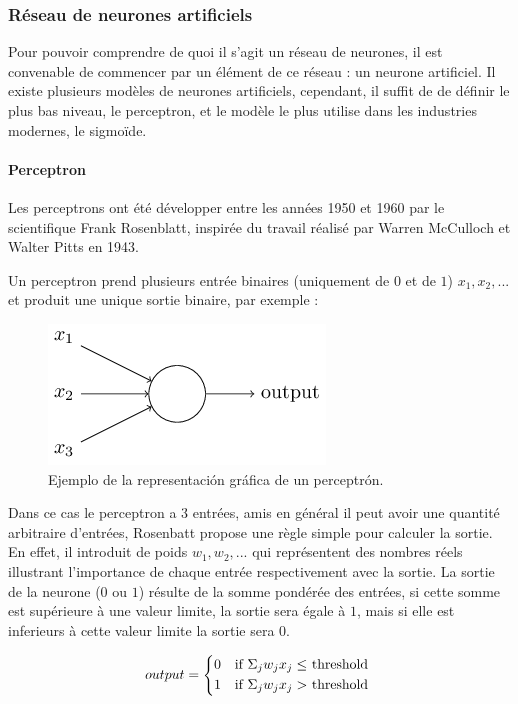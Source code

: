 \documentclass[conference,onecolumn]{IEEEtran}
\begin{document}
\subsubsection{Réseau de neurones artificiels}
Pour pouvoir comprendre de quoi il s’agit un réseau de neurones, il est convenable de commencer par un élément de ce réseau : un neurone artificiel. Il existe plusieurs modèles de neurones artificiels, cependant, il suffit de de définir le plus bas niveau, le perceptron, et le modèle le plus utilise dans les industries modernes, le sigmoïde. 
\hfill\\

\paragraph{Perceptron}
Les perceptrons ont été développer entre les années 1950 et 1960 par le scientifique Frank Rosenblatt, inspirée du travail réalisé par Warren McCulloch et Walter Pitts en 1943. 

Un perceptron prend plusieurs entrée binaires (uniquement de $0$ et de $1$) $x_1, x_2, ...$ et produit une unique sortie binaire, par exemple : 

 \begin{figure}[H]
 \centering
    \includegraphics[scale=0.5]{img9.png}
    \caption{Ejemplo de la representación gráfica de un perceptrón.}
\end{figure}

Dans ce cas le perceptron a 3 entrées, amis en général il peut avoir une quantité arbitraire d’entrées, Rosenbatt propose une règle simple pour calculer la sortie. En effet, il introduit de poids $w_1, w_2, ...$ qui représentent des nombres réels illustrant l’importance de chaque entrée respectivement avec la sortie. La sortie de la neurone ($0$ ou $1$)  résulte de la somme pondérée des entrées, si cette somme est supérieure à une valeur limite, la sortie sera égale à $1$, mais si elle est inferieurs à cette valeur limite la sortie sera $0$. 

\begin{equation}
    output =
    \begin{cases*}
      0 & if $\Sigma_j w_jx_j \leq $ threshold \\
      1 & if $\Sigma_j w_jx_j > $ threshold \\
    \end{cases*}
\end{equation}
\end{document}
